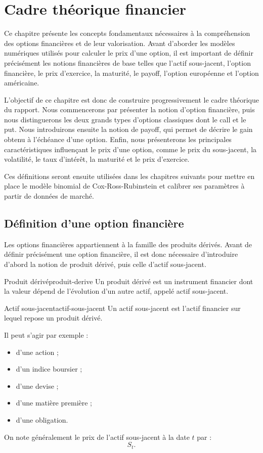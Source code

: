\documentclass[12pt,a4paper]{report}
\begin{document}
\chapter{Cadre théorique financier}

Ce chapitre présente les concepts fondamentaux nécessaires à la compréhension des options financières et de leur valorisation. Avant d’aborder les modèles numériques utilisés pour calculer le prix d’une option, il est important de définir précisément les notions financières de base telles que l'actif sous-jacent, l'option financière, le prix d'exercice, la maturité, le payoff, l'option européenne et l'option américaine.

L’objectif de ce chapitre est donc de construire progressivement le cadre théorique du rapport. Nous commencerons par présenter la notion d’option financière, puis nous distinguerons les deux grands types d’options classiques dont le call et le put. Nous introduirons ensuite la notion de payoff, qui permet de décrire le gain obtenu à l’échéance d’une option. Enfin, nous présenterons les principales caractéristiques influençant le prix d’une option, comme le prix du sous-jacent, la volatilité, le taux d’intérêt, la maturité et le prix d’exercice.

Ces définitions seront ensuite utilisées dans les chapitres suivants pour mettre en place le modèle binomial de Cox-Ross-Rubinstein et calibrer ses paramètres à partir de données de marché.

\section{Définition d'une option financière}

Les options financières appartiennent à la famille des produits dérivés. Avant de définir précisément une option financière, il est donc nécessaire d'introduire d'abord la notion de produit dérivé, puis celle d'actif sous-jacent.

\begin{definition}{Produit dérivé}{produit-derive}
Un produit dérivé est un instrument financier dont la valeur dépend de l'évolution d'un autre actif, appelé actif sous-jacent.
\end{definition}

\begin{definition}{Actif sous-jacent}{actif-sous-jacent}
Un actif sous-jacent est l'actif financier sur lequel repose un produit dérivé.

Il peut s'agir par exemple :
\begin{itemize}
    \item d'une action ;
    \item d'un indice boursier ;
    \item d'une devise ;
    \item d'une matière première ;
    \item d'une obligation.
\end{itemize}

On note généralement le prix de l'actif sous-jacent à la date $t$ par :
\[
S_t.
\]
\end{definition}
\end{document}
